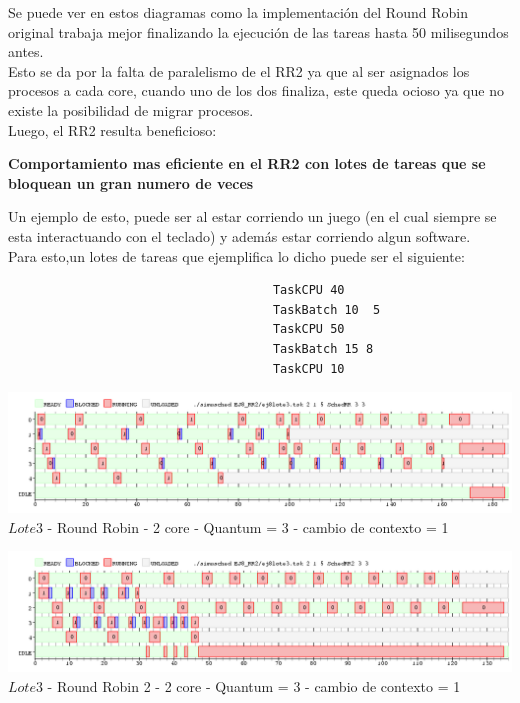  Se puede ver en estos diagramas como la implementación del Round Robin original trabaja
 mejor finalizando la ejecución de las tareas hasta 50 milisegundos antes.\\
 Esto se da por la falta de paralelismo de el RR2 ya que al ser asignados los procesos
 a cada core, cuando uno de los dos finaliza, este queda ocioso ya que no existe la
 posibilidad de migrar  procesos.\\
 
 Luego, el RR2 resulta beneficioso:
 
 \textbf{Comportamiento mas eficiente en el RR2 con lotes de tareas que se bloquean un gran numero
de veces}

\indent Un ejemplo de esto, puede ser al estar corriendo un juego (en el cual siempre se esta interactuando con el teclado) y
adem\'{a}s estar corriendo algun software.\\

Para esto,un lotes de tareas que ejemplifica lo dicho puede ser el siguiente:\\

\begin{verbatim}
                                     TaskCPU 40
                                     TaskBatch 10  5
                                     TaskCPU 50
                                     TaskBatch 15 8
                                     TaskCPU 10

\end{verbatim}


   \begin{center}
    	\includegraphics[width=450pt]{./EJ8_RR2/dif5corerr.png}
	{$Lote 3$ - Round Robin - 2 core - Quantum = 3 - cambio de contexto = 1}	
 \end{center}
 
 \begin{center}
    	\includegraphics[width=450pt]{./EJ8_RR2/dif5corerr2.png}
	{$Lote 3$ - Round Robin 2 - 2 core - Quantum = 3 - cambio de contexto = 1}	
 \end{center}

